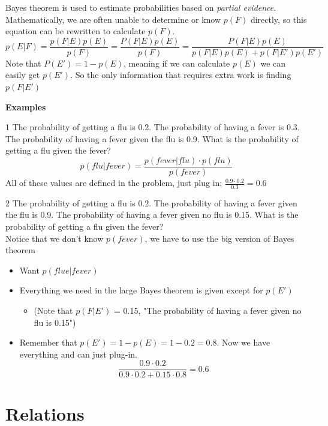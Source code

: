\documentclass[12pt, letterpaper]{article}
\newcommand{\exheader}[1][ex]{{\tiny{#1}\normalsize}}
\begin{document}
\pagebreak

Bayes theorem is used to estimate probabilities based on \emph{partial evidence}. Mathematically, we are often unable to determine or know $p(F)$ directly, so this equation can be rewritten to calculate $p(F)$. 
\[p(E|F) = \frac{p(F|E)p(E)}{p(F)} = \frac{P(F|E)p(E)}{p(F)} = \frac{P(F|E)p(E)}{p(F|E)p(E) + p(F|E')p(E')} \]
Note that $P(E') = 1 - p(E)$, meaning if we can calculate $p(E)$ we can easily get $p(E')$. So the only information that requires extra work is finding $p(F | E')$

\bigbreak \bigbreak

\textbf{Examples} \bigbreak

\exheader[1] The probability of getting a flu is 0.2. The probability of having a fever is 0.3. The probability of having a fever given the flu is 0.9. What is the probability of getting a flu given the fever?
\[ p(flu | fever) = \frac{p(fever |flu) \cdot p(flu)}{p(fever)} \]
All of these values are defined in the problem, just plug in; $\frac{0.9 \cdot 0.2}{0.3} = 0.6$

\bigbreak \bigbreak

\exheader[2] The probability of getting a flu is 0.2. The probability of having a fever given the flu is 0.9. The probability of having a fever given no flu is 0.15. What is the probability of getting a flu given the fever? \\ 
{\small Notice that we don't know $p(fever)$, we have to use the big version of Bayes theorem}
\begin{itemize}[leftmargin=*, label={}]
	\item Want $p(flue | fever)$
	\item Everything we need in the large Bayes theorem is given except for $p(E')$
	\begin{itemize}
		\item[] {\tiny (Note that $p(F | E')$ = 0.15, "The probability of having a fever given no flu is 0.15") }
	\end{itemize}
	\item Remember that $p(E') = 1 - p(E) = 1 - 0.2 = 0.8$. Now we have everything and can just plug-in. \[ \frac{0.9 \cdot 0.2}{0.9 \cdot 0.2 + 0.15 \cdot 0.8} = 0.6  \]
\end{itemize}

\pagebreak

\section{Relations}
\end{document}
